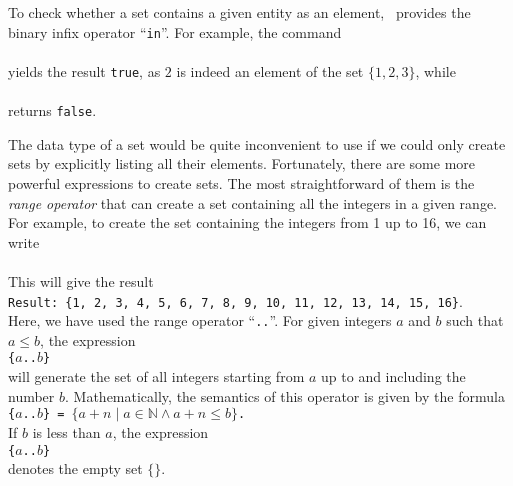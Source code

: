 To check whether a set contains a given entity as an element, \setlx\ provides the binary infix
operator ``\texttt{in}''.  For example, the command
\\[0.2cm]
\hspace*{1.3cm}
\\[0.2cm]
yields the result \texttt{true}, as $2$ is indeed an element of the set $\{1,2,3\}$, while 
\\[0.2cm]
\hspace*{1.3cm}
\\[0.2cm]
 returns \texttt{false}.

The data type of a set would be quite inconvenient to use if we could only create sets by
explicitly listing all their elements.  Fortunately, there are some more powerful expressions to
create sets.  The most straightforward of them is the \emph{range operator} that can create a set
containing all the integers in a given range.  For example, to create the set containing
the integers from 1 up to 16, we can write 
\\[0.2cm]
\hspace*{1.3cm}
\\[0.2cm]
This will give the result
\\[0.2cm]
\hspace*{1.3cm}
\texttt{Result: \{1, 2, 3, 4, 5, 6, 7, 8, 9, 10, 11, 12, 13, 14, 15, 16\}}.
\\[0.2cm]
Here, we have used the range operator ``\texttt{..}''.  For given integers $a$ and $b$
such that $a \leq b$,
the expression
\\[0.2cm]
\hspace*{1.3cm}
\texttt{\{$a$..$b$\}}
\\[0.2cm]
will generate the set of all integers starting from $a$ up to and including the number
$b$.  Mathematically, the semantics of this operator is  given by the formula
\\[0.2cm]
\hspace*{1.3cm}
\texttt{\{$a$..$b$\} = $\{ a + n \mid a \in \mathbb{N} \wedge a + n \leq b\}$.}
\\[0.2cm]
If $b$ is less than $a$, the expression 
\\[0.2cm]
\hspace*{1.3cm}
\texttt{\{$a$..$b$\}}
\\[0.2cm]
denotes the empty set $\{\}$.


